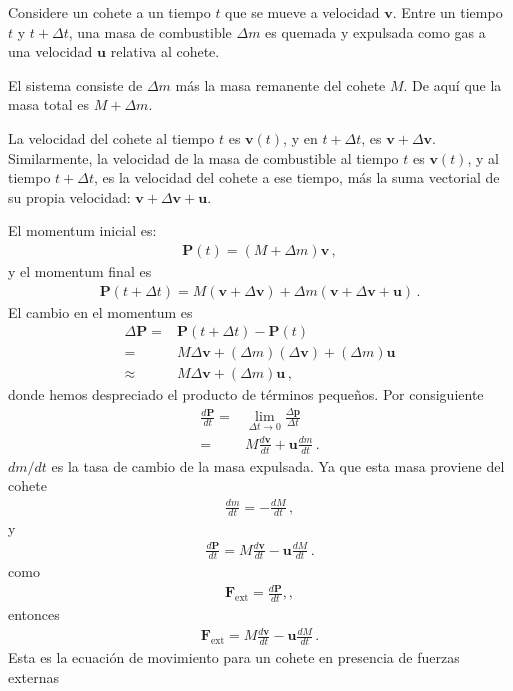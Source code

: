 Considere un cohete a un tiempo $t$ que se mueve a velocidad $\mathbf{v}$. Entre un tiempo $t$ y $t+\Delta t$, una masa de combustible $\Delta m$ es quemada y expulsada como gas a una velocidad $\mathbf{u}$ relativa al cohete.

El sistema consiste de $\Delta m$ más la masa remanente del cohete $M$. De aquí que la masa total es $M+\Delta m$.

La velocidad del cohete al tiempo $t$ es $\mathbf{v}(t)$, y en $t+\Delta t$, es $\mathbf{v}+\Delta\mathbf{v}$. Similarmente, la velocidad de la masa de combustible al tiempo $t$ es $\mathbf{v}(t)$, y al tiempo $t+\Delta t$, es la velocidad del cohete a ese tiempo, más la suma vectorial de su propia velocidad: $\mathbf{v}+\Delta\mathbf{v}+\mathbf{u}$. 

El momentum inicial es:
\begin{align}
  \mathbf{P}(t)=(M+\Delta m)\mathbf{v}\,,
\end{align}
y el momentum final es
\begin{align}
  \mathbf{P}(t+\Delta t)=M(\mathbf{v}+\Delta\mathbf{v})+\Delta m(\mathbf{v}+\Delta\mathbf{v}+\mathbf{u})\,.
\end{align}
El cambio en el momentum es
\begin{align}
  \Delta\mathbf{P}=&\mathbf{P}(t+\Delta t)-\mathbf{P}(t)\nonumber\\
=&M\Delta\mathbf{v}+(\Delta m)(\Delta\mathbf{v})+(\Delta m)\mathbf{u}\nonumber\\
\approx &M\Delta\mathbf{v}+(\Delta m)\mathbf{u}\,,
\end{align}
donde hemos despreciado el producto de términos pequeños. Por consiguiente
\begin{align}
  \frac{d\mathbf{P}}{dt}=&\lim_{\Delta t\to 0}\frac{\Delta\mathbf{p}}{\Delta t}\nonumber\\
=&M\frac{d\mathbf{v}}{dt}+\mathbf{u}\frac{dm}{dt}\,.
\end{align}
$dm/dt$ es la tasa de cambio de la masa expulsada. Ya que esta masa proviene del cohete
\begin{align}
  \frac{dm}{dt}=-\frac{dM}{dt}\,,
\end{align}
y
\begin{align}
  \frac{d\mathbf{P}}{dt}=M\frac{d\mathbf{v}}{dt}-\mathbf{u}\frac{dM}{dt}\,.
\end{align}
como
\begin{align}
  \mathbf{F}_{\text{ext}}=\frac{d\mathbf{P}}{dt},,
\end{align}
entonces
\begin{align}
  \label{eq:mrocket}
   \mathbf{F}_{\text{ext}}=M\frac{d\mathbf{v}}{dt}-\mathbf{u}\frac{dM}{dt}\,.
\end{align}
Esta es la ecuación de movimiento para un cohete en presencia de
fuerzas externas

